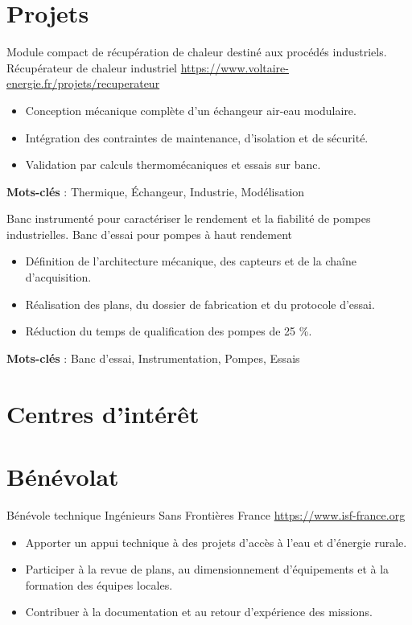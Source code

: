 \documentclass[a4paper, serif, 10pt]{moderncv}
\begin{document}
\section{Projets}

        {Module compact de récupération de chaleur destiné aux procédés industriels.}
        {Récupérateur de chaleur industriel}
        {\url{https://www.voltaire-energie.fr/projets/recuperateur}}
        {}
        {\begin{itemize}
\item Conception mécanique complète d'un échangeur air-eau modulaire.
\item Intégration des contraintes de maintenance, d'isolation et de sécurité.
\item Validation par calculs thermomécaniques et essais sur banc.
\end{itemize}
\textbf{Mots-clés} : Thermique, Échangeur, Industrie, Modélisation}

        {Banc instrumenté pour caractériser le rendement et la fiabilité de pompes industrielles.}
        {Banc d'essai pour pompes à haut rendement}
        {}
        {}
        {\begin{itemize}
\item Définition de l'architecture mécanique, des capteurs et de la chaîne d'acquisition.
\item Réalisation des plans, du dossier de fabrication et du protocole d'essai.
\item Réduction du temps de qualification des pompes de 25 \%.
\end{itemize}
\textbf{Mots-clés} : Banc d'essai, Instrumentation, Pompes, Essais}
\section{Centres d'intérêt}

\section{Bénévolat}

        {Bénévole technique}
        {Ingénieurs Sans Frontières France}
        {\url{https://www.isf-france.org}}
        {}
        {\begin{itemize}
\item Apporter un appui technique à des projets d'accès à l'eau et d'énergie rurale.
\item Participer à la revue de plans, au dimensionnement d'équipements et à la formation des équipes locales.
\item Contribuer à la documentation et au retour d'expérience des missions.
\end{itemize}}
    
\end{document}
